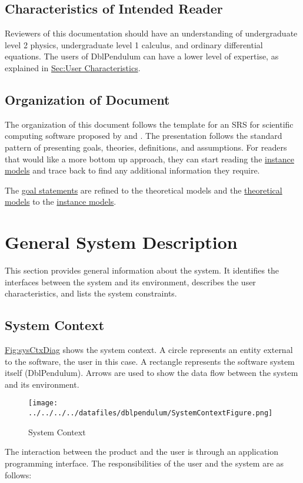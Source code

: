 \documentclass[12pt]{article}
\begin{document}
\subsection{Characteristics of Intended Reader}
\label{Sec:ReaderChars}
Reviewers of this documentation should have an understanding of undergraduate level 2 physics, undergraduate level 1 calculus, and ordinary differential equations. The users of DblPendulum can have a lower level of expertise, as explained in \hyperref[Sec:UserChars]{Sec:User Characteristics}.

\subsection{Organization of Document}
\label{Sec:DocOrg}
The organization of this document follows the template for an SRS for scientific computing software proposed by \cite{koothoor2013} and \cite{smithLai2005}. The presentation follows the standard pattern of presenting goals, theories, definitions, and assumptions. For readers that would like a more bottom up approach, they can start reading the \hyperref[Sec:IMs]{instance models} and trace back to find any additional information they require.

The \hyperref[Sec:GoalStmt]{goal statements} are refined to the theoretical models and the \hyperref[Sec:TMs]{theoretical models} to the \hyperref[Sec:IMs]{instance models}.

\section{General System Description}
\label{Sec:GenSysDesc}
This section provides general information about the system. It identifies the interfaces between the system and its environment, describes the user characteristics, and lists the system constraints.

\subsection{System Context}
\label{Sec:SysContext}
\hyperref[Figure:sysCtxDiag]{Fig:sysCtxDiag} shows the system context. A circle represents an entity external to the software, the user in this case. A rectangle represents the software system itself (DblPendulum). Arrows are used to show the data flow between the system and its environment.

\begin{figure}
\begin{center}
\texttt{[image: ../../../../datafiles/dblpendulum/SystemContextFigure.png]}
\caption{System Context}
\label{Figure:sysCtxDiag}
\end{center}
\end{figure}
The interaction between the product and the user is through an application programming interface. The responsibilities of the user and the system are as follows:
\end{document}
